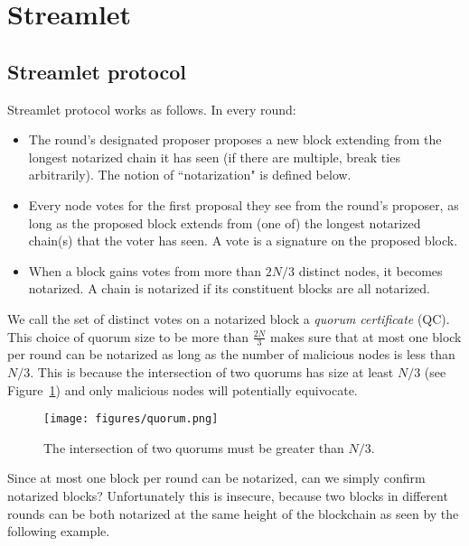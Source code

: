 \documentclass{article}
\begin{document}
\section*{Streamlet}

\subsection*{Streamlet protocol}

 Streamlet protocol works as follows. In every round:
\begin{itemize}
    \item The round’s designated proposer proposes a new block extending from the longest notarized chain it has seen (if there are multiple, break ties arbitrarily). The notion of  ``notarization" is defined below.
    \item Every node votes for the first proposal they see from the round’s proposer, as long as the proposed block extends from (one of) the longest notarized chain(s) that the voter has seen. A vote is a signature on the proposed block.
    \item When a block gains votes from more than $2N/3$ distinct nodes, it becomes notarized. A chain is notarized if its constituent blocks are all notarized.
\end{itemize}

We call the set of  distinct votes on a notarized block a {\it quorum certificate} (QC). This choice of quorum size to be more than $\frac{2N}{3}$ makes sure that at most one block per round can be notarized as long as the number of malicious nodes is less than $N/3$. This is because the intersection of two quorums has size at least $N/3$ (see Figure~\ref{fig:quorum}) and only malicious nodes will potentially equivocate.

\begin{figure}
    \centering
    \texttt{[image: figures/quorum.png]}
    \caption{The intersection of two quorums must be greater than $N/3$.}
    \label{fig:quorum}
\end{figure}


 Since at most one block per round can be notarized, can we simply confirm notarized blocks? Unfortunately this is insecure,  because two blocks in different rounds can be both notarized at the same height of the blockchain as seen by the following example.
\end{document}
